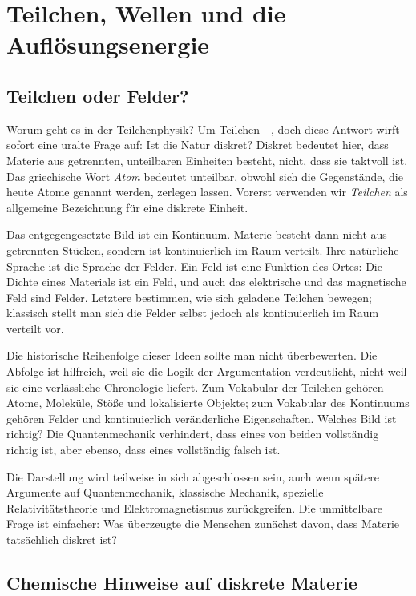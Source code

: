 \chapter{Teilchen, Wellen und die Auflösungsenergie}

\section{Teilchen oder Felder?}

Worum geht es in der Teilchenphysik? Um Teilchen---, doch diese Antwort wirft sofort eine uralte Frage auf: Ist die Natur diskret? Diskret bedeutet hier, dass Materie aus getrennten, unteilbaren Einheiten besteht, nicht, dass sie taktvoll ist. Das griechische Wort \emph{Atom} bedeutet unteilbar, obwohl sich die Gegenstände, die heute Atome genannt werden, zerlegen lassen. Vorerst verwenden wir \emph{Teilchen} als allgemeine Bezeichnung für eine diskrete Einheit.

Das entgegengesetzte Bild ist ein Kontinuum. Materie besteht dann nicht aus getrennten Stücken, sondern ist kontinuierlich im Raum verteilt. Ihre natürliche Sprache ist die Sprache der Felder. Ein Feld ist eine Funktion des Ortes: Die Dichte eines Materials ist ein Feld, und auch das elektrische und das magnetische Feld sind Felder. Letztere bestimmen, wie sich geladene Teilchen bewegen; klassisch stellt man sich die Felder selbst jedoch als kontinuierlich im Raum verteilt vor.

Die historische Reihenfolge dieser Ideen sollte man nicht überbewerten. Die Abfolge ist hilfreich, weil sie die Logik der Argumentation verdeutlicht, nicht weil sie eine verlässliche Chronologie liefert. Zum Vokabular der Teilchen gehören Atome, Moleküle, Stöße und lokalisierte Objekte; zum Vokabular des Kontinuums gehören Felder und kontinuierlich veränderliche Eigenschaften. Welches Bild ist richtig? Die Quantenmechanik verhindert, dass eines von beiden vollständig richtig ist, aber ebenso, dass eines vollständig falsch ist.

Die Darstellung wird teilweise in sich abgeschlossen sein, auch wenn spätere Argumente auf Quantenmechanik, klassische Mechanik, spezielle Relativitätstheorie und Elektromagnetismus zurückgreifen. Die unmittelbare Frage ist einfacher: Was überzeugte die Menschen zunächst davon, dass Materie tatsächlich diskret ist?

\section{Chemische Hinweise auf diskrete Materie}

